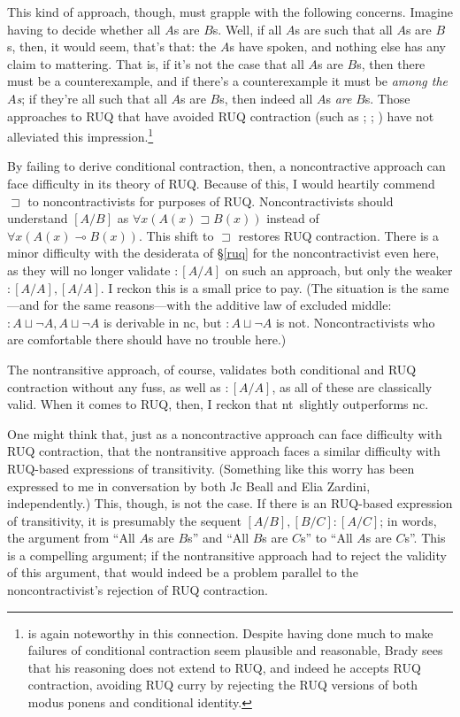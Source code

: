 \documentclass{ergoclass}
\newcommand{\sqq}[2]{\ensuremath{#1  \mathrel{:}  #2}}
\newcommand{\rall}[3]{\ensuremath{#1[#2/#3]}}
\newcommand{\mcond}{\ensuremath{\multimap}}
\newcommand{\acond}{\ensuremath{\sqsupset}}
\newcommand{\aor}{\ensuremath{\sqcup}}
\newcommand{\nclog}{{\sc nc}}
\newcommand{\ntlog}{{\sc nt}}
\renewcommand{\cite}{\citet}						%
\begin{document}
This kind of approach, though, must grapple with the following concerns. Imagine having to decide whether all $A$s are $B$s. Well, if all $A$s are such that all $A$s are $B$s, then, it would seem, that's that: the $A$s have spoken, and nothing else has any claim to mattering. That is, if it's not the case that all $A$s are $B$s, then there must be a counterexample, and if there's a counterexample it must be {\em among the $A$s}; if they're all such that all $A$s are $B$s, then indeed all $A$s {\em are} $B$s. Those approaches to RUQ that have avoided RUQ contraction (such as \citealp{rrq}; \citealp{beall:sot}; \citealp{field:stp,field:ntrq}) have not alleviated this impression.\footnote{\cite{brady:ul} is again noteworthy in this connection. Despite having done much to make failures of conditional contraction seem plausible and reasonable, Brady sees that his reasoning does not extend to RUQ, and indeed he accepts RUQ contraction, avoiding RUQ curry by rejecting the RUQ versions of both modus ponens and conditional identity.}

By failing to derive conditional contraction, then, a noncontractive approach can face difficulty in its theory of RUQ. Because of this, I would heartily commend $\acond$ to noncontractivists for purposes of RUQ. Noncontractivists should understand $\rall{}{A}{B}$ as $\forall x (A(x) \acond B(x))$ instead of $\forall x (A(x) \mcond B(x))$. This shift to $\acond$ restores RUQ contraction. There is a minor difficulty with the desiderata of \S\ref{ruq} for the noncontractivist even here, as they will no longer validate $\sqq{}{\rall{}{A}{A}}$ on such an approach, but only the weaker $\sqq{}{\rall{}{A}{A}, \rall{}{A}{A}}$. I reckon this is a small price to pay. (The situation is the same---and for the same reasons---with the additive law of excluded middle: $\sqq{}{A \aor \neg A, A \aor \neg A}$ is derivable in \nclog, but $\sqq{}{A \aor \neg A}$ is not. Noncontractivists who are comfortable there should have no trouble here.)

The nontransitive approach, of course, validates both conditional and RUQ contraction without any fuss, as well as $\sqq{}{\rall{}{A}{A}}$, as all of these are classically valid. When it comes to RUQ, then, I reckon that \ntlog\ slightly outperforms \nclog. 

One might think that, just as a noncontractive approach can face difficulty with RUQ contraction, that the nontransitive approach faces a similar difficulty with RUQ-based expressions of transitivity. (Something like this worry has been expressed to me in conversation by both Jc Beall and Elia Zardini, independently.) This, though, is not the case. If there is an RUQ-based expression of transitivity, it is presumably the sequent $\sqq{\rall{}{A}{B}, \rall{}{B}{C}}{\rall{}{A}{C}}$; in words, the argument from ``All $A$s are $B$s'' and ``All $B$s are $C$s'' to ``All $A$s are $C$s''. This is a compelling argument; if the nontransitive approach had to reject the validity of this argument, that would indeed be a problem parallel to the noncontractivist's rejection of RUQ contraction.
\end{document}
